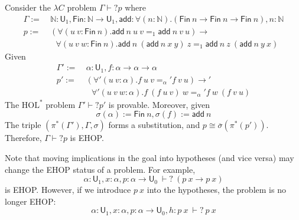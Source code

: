\begin{example} Consider the $\lambda C$ problem $\Gamma \vdash? p$ where
\begin{align*}
  \Gamma := \ & \mathbb{N} : \mathsf{U}_1, \mathsf{Fin} : \mathbb{N} \to \mathsf{U}_1,
  \mathsf{add} : \forall (n : \mathbb{N}). (\mathsf{Fin} \ n \to \mathsf{Fin} \ n \to \mathsf{Fin} \ n), n : \mathbb{N} \\
  p := \ & (\forall (u \ v : \mathsf{Fin} \ n). \mathsf{add} \ n \ u \ v =_1 \mathsf{add} \ n \ v \ u) \to \\
  & \ \ \ \forall (u \ v \ w : \mathsf{Fin} \ n). \mathsf{add} \ n \ (\mathsf{add} \ n \ x \ y) \ z =_1 \mathsf{add} \ n \ z \ (\mathsf{add} \ n \ y \ x)
\end{align*}
Given
\begin{align*}
  \Gamma' := \ & \alpha : \mathsf{U}_1, f : \alpha \to \alpha \to \alpha \\
  p' := \ & (\forall' (u \ v : \alpha). f \ u \ v =_\alpha' f \ v \ u) \to' \\
  & \ \ \ \forall' (u \ v \ w : \alpha). f \ (f \ u \ v) \ w =_\alpha' f \ w \ (f \ v \ u)
\end{align*}
The $\text{HOL}^*$ problem $\Gamma' \vdash? p'$ is provable. Moreover, given
$$\sigma(\alpha) := \mathsf{Fin} \ n, \sigma(f) := \mathsf{add} \ n$$
The triple $(\pi^*(\Gamma'), \Gamma, \sigma)$ forms a substitution, and $p \cong \overline{\sigma}(\pi^*(p'))$.
Therefore, $\Gamma \vdash? p$ is EHOP.
\end{example}

Note that moving implications in the goal into hypotheses (and vice versa) may
change the EHOP status of a problem. For example,
$$\alpha : \mathsf{U}_1, x : \alpha, p : \alpha \to \mathsf{U}_0  \ \vdash? \ (p \ x \to p \ x)$$
is EHOP. However, if we introduce $p \ x$ into the hypotheses, the problem is no longer EHOP:
\begin{equation}\label{hypnehop}
  \alpha : \mathsf{U}_1, x : \alpha, p : \alpha \to \mathsf{U}_0, h : p \ x  \ \vdash? \ p \ x
\end{equation}

